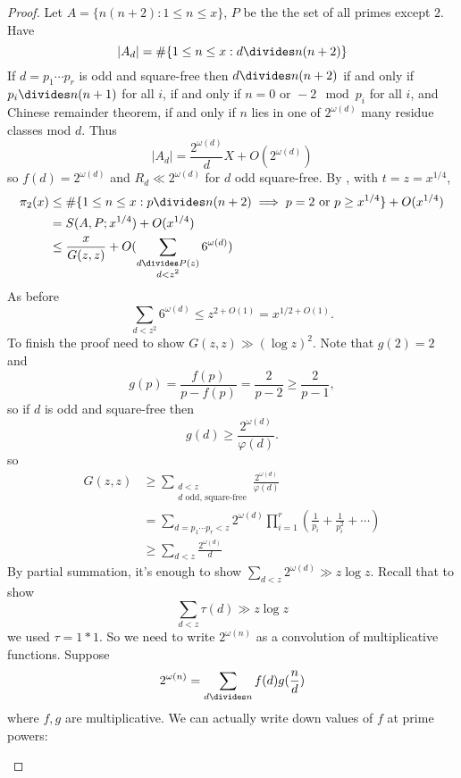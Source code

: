 \documentclass[a4paper]{article}
\theoremstyle{definition}
\begin{document}
\begin{proof}
  Let \(A = \{n (n + 2): 1 \leq n \leq x\}\), \(P\) be the the set of all primes except \(2\). Have
  \[
    |A_d| = \#\{1 \leq n \leq x: d \divides n (n + 2)\}
  \]
  If \(d = p_1 \cdots p_r\) is odd and square-free then \(d \divides n(n + 2)\) if and only if \(p_i \divides n(n + 1)\) for all \(i\), if and only if \(n = 0 \text{ or } -2 \mod p_i\) for all \(i\), and Chinese remainder theorem, if and only if \(n\) lies in one of \(2^{\omega(d)}\) many residue classes mod \(d\). Thus
  \[
    |A_d| = \frac{2^{\omega(d)}}{d} X + O(2^{\omega(d)})
  \]
  so \(f(d) = 2^{\omega(d)}\) and \(R_d \ll 2^{\omega(d)}\) for \(d\) odd square-free. By , with \(t = z = x^{1/4}\),
  \begin{align*}
    \pi_2(x)
    &\leq \#\{1 \leq n \leq x: p \divides n(n + 2) \implies p = 2 \text{ or } p \geq x^{1/4}\} + O(x^{1/4}) \\
    &= S(A, P; x^{1/4}) + O(x^{1/4}) \\
    &\leq \frac{x}{G(z, z)} + O(\sum_{\substack{d \divides P(z) \\ d < z^2}} 6^{\omega(d)})
  \end{align*}
  As before
  \[
    \sum_{d < z^2} 6^{\omega(d)} \leq z^{2 + O(1)} = x^{1/2 + O(1)}.
  \]
  To finish the proof need to show \(G(z, z) \gg (\log z)^2\). Note that \(g(2) = 2\) and
  \[
    g(p) = \frac{f(p)}{p - f(p)} = \frac{2}{p - 2} \geq \frac{2}{p - 1},
  \]
  so if \(d\) is odd and square-free then
  \[
    g(d) \geq \frac{2^{\omega(d)}}{\varphi(d)}.
  \]
  so
  \begin{align*}
    G(z, z)
    &\geq \sum_{\substack{d < z \\ d \text{ odd, square-free}}} \frac{2^{\omega(d)}}{\varphi(d)} \\
    &= \sum_{d = p_1 \cdots p_r < z} 2^{\omega(d)} \prod_{i = 1}^r \left( \frac{1}{p_i} + \frac{1}{p_i^2} + \cdots \right) \\
    &\geq \sum_{d < z} \frac{2^{\omega(d)}}{d}
  \end{align*}
  By partial summation, it's enough to show \(\sum_{d < z} 2^{\omega(d)} \gg z \log z\). Recall that to show
  \[
    \sum_{d < z} \tau(d) \gg z \log z
  \]
  we used \(\tau = 1 * 1\). So we need to write \(2^{\omega(n)}\) as a convolution of multiplicative functions. Suppose
  \[
    2^{\omega(n)} = \sum_{d \divides n} f(d) g(\frac{n}{d})
  \]
  where \(f, g\) are multiplicative. We can actually write down values of \(f\) at prime powers:
  \begin{enumerate}

\end{enumerate}
\end{proof}
\end{document}
